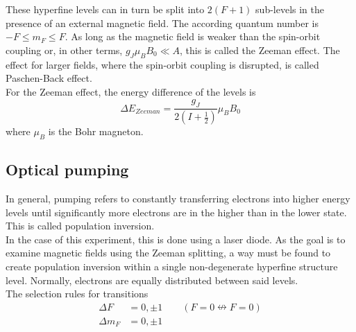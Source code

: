 These hyperfine levels can in turn be split into $2(F+1)$ sub-levels in the presence of an external magnetic field. The according quantum number is $-F\le m_F\le F$. As long as the magnetic field is weaker than the spin-orbit coupling or, in other terms, $g_J\mu_BB_0\ll A$, this is called the Zeeman effect. The effect for larger fields, where the spin-orbit coupling is disrupted, is called Paschen-Back effect.\\
For the Zeeman effect, the energy difference of the levels is
\begin{equation}
\Delta E_{Zeeman}=\frac{g_J}{2(I+\frac{1}{2})}\mu_BB_0
\label{eq:zeemanlevels}
\end{equation}
where $\mu_B$ is the Bohr magneton.

\subsection{Optical pumping}
In general, pumping refers to constantly transferring electrons into higher energy levels until significantly more electrons are in the higher than in the lower state. This is called population inversion.\\
In the case of this experiment, this is done using a laser diode. As the goal is to examine magnetic fields using the Zeeman splitting, a way must be found to create population inversion within a single non-degenerate hyperfine structure level. Normally, electrons are equally distributed between said levels.\\
The selection rules for transitions
\begin{equation}
\begin{aligned}
\Delta F&=0,\pm 1 \qquad (F=0\nleftrightarrow F=0)\\
\Delta m_F&=0,\pm 1
\end{aligned}
\end{equation}

